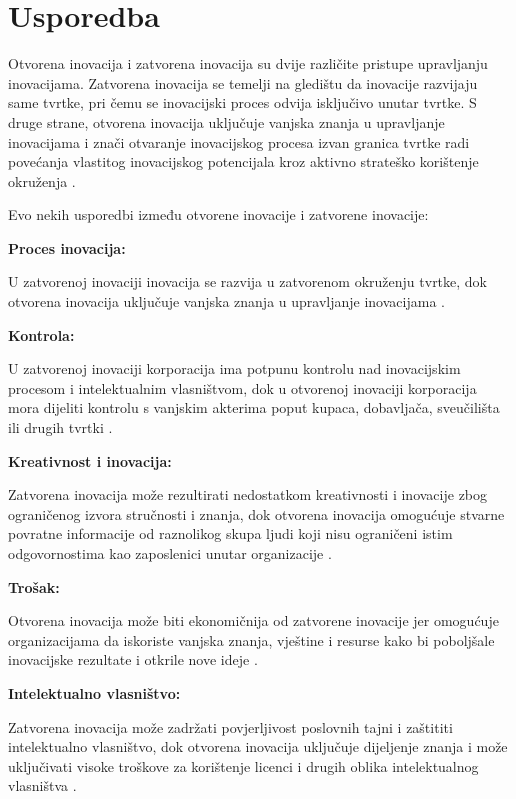 \section{Usporedba} \label{sec:usporedba}

Otvorena inovacija i zatvorena inovacija su dvije različite pristupe upravljanju
inovacijama. Zatvorena inovacija se temelji na gledištu da inovacije razvijaju
same tvrtke, pri čemu se inovacijski proces odvija isključivo unutar tvrtke. S
druge strane, otvorena inovacija uključuje vanjska znanja u upravljanje
inovacijama i znači otvaranje inovacijskog procesa izvan granica tvrtke radi
povećanja vlastitog inovacijskog potencijala kroz aktivno strateško korištenje
okruženja \citep{asd3}.

Evo nekih usporedbi između otvorene inovacije i zatvorene inovacije:

\textbf{Proces inovacija:}

U zatvorenoj inovaciji inovacija se razvija u zatvorenom okruženju tvrtke, dok
otvorena inovacija uključuje vanjska znanja u upravljanje inovacijama \citep{asd3}.

\textbf{Kontrola:}

U zatvorenoj inovaciji korporacija ima potpunu kontrolu nad inovacijskim
procesom i intelektualnim vlasništvom, dok u otvorenoj inovaciji korporacija
mora dijeliti kontrolu s vanjskim akterima poput kupaca, dobavljača, sveučilišta
ili drugih tvrtki \citep{asd3}.

\textbf{Kreativnost i inovacija:}

Zatvorena inovacija može rezultirati nedostatkom kreativnosti i inovacije zbog
ograničenog izvora stručnosti i znanja, dok otvorena inovacija omogućuje stvarne
povratne informacije od raznolikog skupa ljudi koji nisu ograničeni istim
odgovornostima kao zaposlenici unutar organizacije \citep{asd3}.

\textbf{Trošak:}

Otvorena inovacija može biti ekonomičnija od zatvorene inovacije jer omogućuje
organizacijama da iskoriste vanjska znanja, vještine i resurse kako bi
poboljšale inovacijske rezultate i otkrile nove ideje \citep{asd3}.

\textbf{Intelektualno vlasništvo:}

Zatvorena inovacija može zadržati povjerljivost poslovnih tajni i zaštititi
intelektualno vlasništvo, dok otvorena inovacija uključuje dijeljenje znanja i
može uključivati visoke troškove za korištenje licenci i drugih oblika
intelektualnog vlasništva \citep{asd3}.

